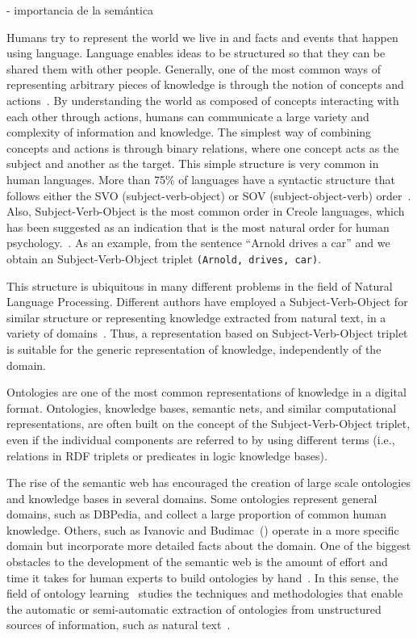 - importancia de la semántica


Humans try to represent the world we live in and facts and events that happen using language. Language enables ideas to be structured so that they can be shared them with other people.
Generally, one of the most common ways of representing arbitrary pieces of knowledge is through the notion of concepts and actions~\cite{teleologies}.
By understanding the world as composed of concepts interacting with each other through actions, humans can communicate a large variety and
complexity of information and knowledge.
The simplest way of combining concepts and actions is through binary relations, where one concept acts as the subject and another as the target.
This simple structure is very common in human languages.
More than 75\% of languages have a syntactic structure that follows either the SVO (subject-verb-object) or SOV (subject-object-verb) order~\cite{cambridge}.
Also, Subject-Verb-Object is the most common order in Creole languages, which has been suggested as an indication that is the most natural order
for human psychology.~\cite{diamond2013rise}.
As an example, from the sentence ``Arnold drives a car'' and we obtain an Subject-Verb-Object triplet \verb|(Arnold, drives, car)|.

This structure is ubiquitous in many different problems in the field of Natural Language Processing.
Different authors have employed a Subject-Verb-Object for similar structure or representing knowledge extracted from natural text, in a variety of domains~\cite{never-ending-learner,emotinet}.
Thus, a representation based on Subject-Verb-Object triplet is suitable for the generic representation of knowledge, independently of the domain.

Ontologies are one of the most common representations of knowledge in a digital format.
Ontologies, knowledge bases, semantic nets, and similar computational representations, are often built on the concept of the Subject-Verb-Object triplet, even if the individual components are referred to by using different terms (i.e., relations in RDF triplets or predicates in logic knowledge bases).

The rise of the semantic web has encouraged the creation of large scale ontologies and knowledge bases in several domains.
Some ontologies represent general domains, such as DBPedia, and collect a large proportion of common human knowledge.
Others, such as Ivanovic and Budimac~(\cite{IVANOVIC20145158}) operate in a more specific domain but incorporate more detailed facts about the domain.
One of the biggest obstacles to the development of the semantic web is the amount of effort and time it takes for human experts to build ontologies by hand~\cite{gomez2006ontological, petasis2011ontology}.
In this sense, the field of ontology learning~\cite{buitelaar2005ontology} studies the techniques and methodologies that enable the automatic or semi-automatic extraction of ontologies from unstructured sources of information, such as natural text~\cite{mitchell2015never,emotinet}.

